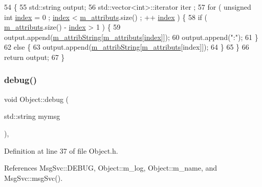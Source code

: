 \begin{DoxyCode}
54                             \{
55   std::string output;
56   std::vector<int>::iterator iter ;
57   \textcolor{keywordflow}{for} ( \textcolor{keywordtype}{unsigned} \textcolor{keywordtype}{int} \hyperlink{namespaceimages_a54407fd574970b3178647ae096321a57}{index} = 0 ; \hyperlink{namespaceimages_a54407fd574970b3178647ae096321a57}{index} < \hyperlink{classAttrib_ac4bd58a0cc6b38a3b711d609a3d3aacc}{m\_attributs}.size() ; ++
      \hyperlink{namespaceimages_a54407fd574970b3178647ae096321a57}{index} ) \{
58     \textcolor{keywordflow}{if} ( \hyperlink{classAttrib_ac4bd58a0cc6b38a3b711d609a3d3aacc}{m\_attributs}.size() - \hyperlink{namespaceimages_a54407fd574970b3178647ae096321a57}{index} > 1 ) \{
59       output.append(\hyperlink{classAttrib_a3414521d7a82476e874b25a5407b5e63}{m\_attribString}[\hyperlink{classAttrib_ac4bd58a0cc6b38a3b711d609a3d3aacc}{m\_attributs}[\hyperlink{namespaceimages_a54407fd574970b3178647ae096321a57}{index}]]);
60       output.append(\textcolor{stringliteral}{":"});
61     \}
62     \textcolor{keywordflow}{else} \{
63       output.append(\hyperlink{classAttrib_a3414521d7a82476e874b25a5407b5e63}{m\_attribString}[\hyperlink{classAttrib_ac4bd58a0cc6b38a3b711d609a3d3aacc}{m\_attributs}[index]]);
64     \}
65   \}
66   \textcolor{keywordflow}{return} output;
67 \}
\end{DoxyCode}
\mbox{\label{classObject_aac010553f022165573714b7014a15f0d}} 
\subsubsection{\texorpdfstring{debug()}{debug()}\hspace{0.1cm}{\footnotesize\ttfamily [1/2]}}
{\footnotesize\ttfamily void Object\+::debug (\begin{DoxyParamCaption}\item[{std\+::string}]{mymsg }\end{DoxyParamCaption})\hspace{0.3cm}{\ttfamily [inline]}, {\ttfamily [inherited]}}



Definition at line 37 of file Object.\+h.



References Msg\+Svc\+::\+D\+E\+B\+UG, Object\+::m\+\_\+log, Object\+::m\+\_\+name, and Msg\+Svc\+::msg\+Svc().



